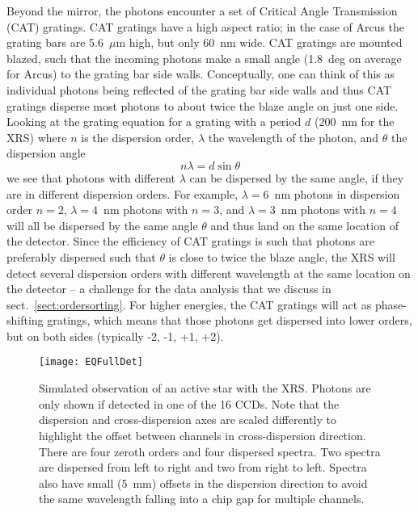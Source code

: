 \documentclass[12pt]{spieman}  %
\begin{document}
\begin{spacing}{2}
Beyond the mirror, the photons encounter a set of Critical Angle Transmission (CAT) gratings\cite{10.1117/12.926827,2022ApJ...934..171H}. CAT gratings have a high aspect ratio; in the case of Arcus the grating bars are 5.6~$\mu$m high, but only 60~nm wide. CAT gratings are mounted blazed, such that the incoming photons make a small angle (1.8~deg on average for Arcus) to the grating bar side walls. Conceptually, one can think of this as individual photons being reflected of the grating bar side walls and thus CAT gratings disperse most photons to about twice the blaze angle on just one side. Looking at the grating equation for a grating with a period $d$ (200~nm for the XRS) where $n$ is the dispersion order, $\lambda$ the wavelength of the photon, and $\theta$ the dispersion angle
\begin{equation}
    n \lambda = d \sin{\theta} \label{eqn:grating}
\end{equation}
we see that photons with different $\lambda$ can be dispersed by the same angle, if they are in different dispersion orders. For example, $\lambda=6$~nm photons in dispersion order $n=2$, $\lambda=4$~nm photons with $n=3$, and $\lambda=3$~nm photons with $n=4$ will all be dispersed by the same angle $\theta$ and thus land on the same location of the detector. Since the efficiency of CAT gratings is such that photons are preferably dispersed such that $\theta$ is close to twice the blaze angle, the XRS will detect several dispersion orders with different wavelength at the same location on the detector -- a challenge for the data analysis that we discuss in sect.~\ref{sect:ordersorting}. For higher energies, the CAT gratings will act as phase-shifting gratings, which means that those photons get dispersed into lower orders, but on both sides (typically -2, -1, +1, +2).

\begin{figure}
    \centering
    \texttt{[image: EQFullDet]}
    \caption {\label{fig:fulldet}
    Simulated observation of an active star with the XRS. Photons are only shown if detected in one of the 16 CCDs. Note that the dispersion and cross-dispersion axes are scaled differently to highlight the offset between channels in cross-dispersion direction. There are four zeroth orders and four dispersed spectra. Two spectra are dispersed from left to right and two from right to left. Spectra also have small (5~mm) offsets in the dispersion direction to avoid the same wavelength falling into a chip gap for multiple channels.
}
\end{figure}


\end{spacing}
\end{document}
